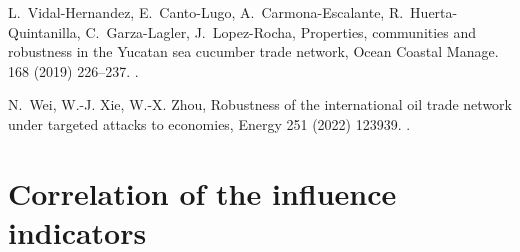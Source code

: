 \documentclass[preprint,3p,times,sort&compress]{elsarticle}
\begin{document}
\begin{thebibliography}{10}
L.~Vidal-Hernandez, E.~Canto-Lugo, A.~Carmona-Escalante, R.~Huerta-Quintanilla,
  C.~Garza-Lagler, J.~Lopez-Rocha, Properties, communities and robustness in
  the {Y}ucatan sea cucumber trade network, Ocean Coastal Manage. 168 (2019)
  226--237.
\newblock \href {https://doi.org/10.1016/j.ocecoaman.2018.10.036}
  {}.

N.~Wei, W.-J. Xie, W.-X. Zhou, Robustness of the international oil trade
  network under targeted attacks to economies, Energy 251 (2022) 123939.
\newblock \href {https://doi.org/10.1016/j.energy.2022.123939}
  {}.

\end{thebibliography}



\clearpage


\appendix

\renewcommand\thetable{\Alph{section}\arabic{table}}    
\section{Correlation of the influence indicators}
\label{sec5-1}
\setcounter{table}{0}
\end{document}
